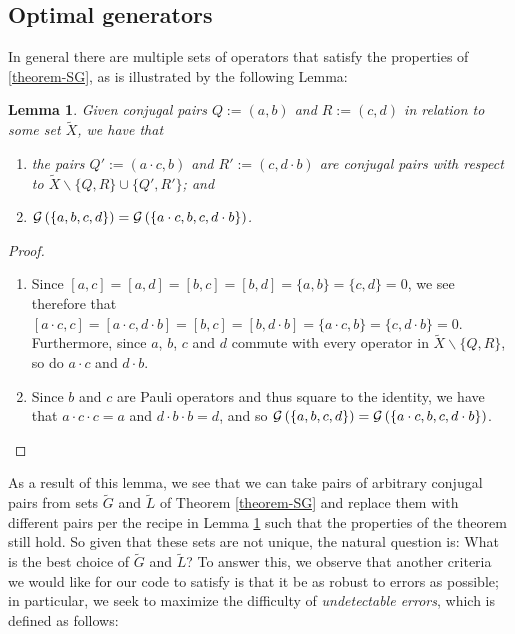 \documentclass[twocolumn,showpacs,preprintnumbers,amsmath,amssymb,nofootinbib,pra,floatfix]{revtex4-1}
\newtheorem{lemma}{Lemma}
\newcommand{\set}{\tilde}
\newcommand{\genfun}{\mathcal{G}}
\begin{document}
\subsection{Optimal generators}

\label{optimal-generators}

In general there are multiple sets of operators that satisfy the properties of \ref{theorem-SG}, as is illustrated by the following Lemma:

\begin{lemma}
\label{combining-pairs}
Given conjugal pairs $Q:=(a,b)$ and $R:=(c,d)$ in relation to some set $\set X$, we have that
\begin{enumerate}
\item the pairs $Q':=(a\cdot c,b)$ and $R':=(c,d\cdot b)$ are conjugal pairs with respect to $\set X \backslash \{Q,R\} \cup \{Q',R'\}$; and
\item $\genfun\paren{\{a,b,c,d\}}=\genfun\paren{\{a\cdot c,b,c,d\cdot b\}}$.
\end{enumerate}
\end{lemma}

\begin{proof}
\begin{enumerate}
\item Since $[a,c]=[a,d]=[b,c]=[b,d]=\{a,b\}=\{c,d\}=0$, we see therefore that $[a\cdot c,c]=[a\cdot c,d\cdot b]=[b,c]=[b,d\cdot b]=\{a\cdot c,b\}=\{c,d\cdot b\}=0$.  Furthermore, since $a$, $b$, $c$ and $d$ commute with every operator in $\set X\backslash \{Q,R\}$, so do $a\cdot c$ and $d\cdot b$.
\item Since $b$ and $c$ are Pauli operators and thus square to the identity, we have that $a\cdot c\cdot c=a$ and $d\cdot b\cdot b=d$, and so $\genfun\paren{\{a,b,c,d\}}=\genfun\paren{\{a\cdot c,b,c,d\cdot b\}}$.
\end{enumerate}
\end{proof}
As a result of this lemma, we see that we can take pairs of arbitrary conjugal pairs from sets $\set G$ and $\set L$ of Theorem \ref{theorem-SG} and replace them with different pairs per the recipe in Lemma \ref{combining-pairs} such that the properties of the theorem still hold.  So given that these sets are not unique, the natural question is:  What is the best choice of $\set G$ and $\set L$?  To answer this, we observe that another criteria we would like for our code to satisfy is that it be as robust to errors as possible;  in particular, we seek to maximize the difficulty of \emph{undetectable errors}, which is defined as follows:
\end{document}
